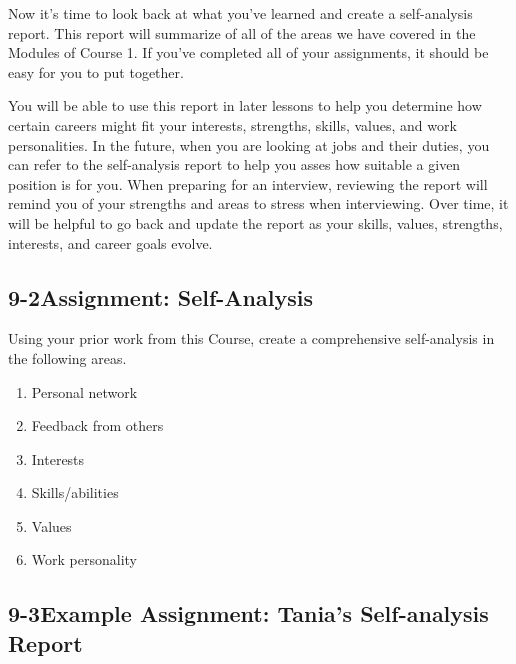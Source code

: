 Now it's time to look back at what you've learned and create a self-analysis report. This report will summarize of all of the areas we have covered in the Modules of Course 1. If you've completed all of your assignments, it should be easy for you to put together.

You will be able to use this report in later lessons to help you determine how certain careers might fit your interests, strengths, skills, values, and work personalities. In the future, when you are looking at jobs and their duties, you can refer to the self-analysis report to help you asses how suitable a given position is for you. When preparing for an interview, reviewing the report will remind you of your strengths and areas to stress when interviewing. Over time, it will be helpful to go back and update the report as your skills, values, strengths, interests, and career goals evolve.
\pagebreak \subsection*{9-2\quad Assignment: Self-Analysis}
Using your prior work from this Course, create a comprehensive self-analysis in the following areas.
\begin{enumerate}[leftmargin=1cm]
	\item Personal network
	\item Feedback from others
	\item Interests
	\item Skills/abilities
	\item Values
	\item Work personality
\end{enumerate}
\pagebreak \subsection*{9-3\quad Example Assignment: Tania's Self-analysis Report}

